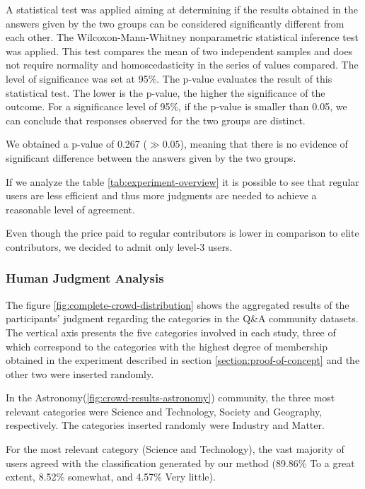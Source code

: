 A statistical test was applied aiming at determining if the results obtained in the answers given by the two groups can be considered significantly different from each other. The Wilcoxon-Mann-Whitney nonparametric statistical inference test was applied\cite{feltovich2003nonparametric}. This test compares the mean of two independent samples and does not require normality and homoscedasticity in the series of values compared. The level of significance was set at 95\%. The p-value evaluates the result of this statistical test. The lower is the p-value, the higher the significance of the outcome. For a significance level of 95\%, if the p-value is smaller than 0.05, we can conclude that responses observed for the two groups are distinct. 

We obtained a p-value of  0.267 ($\gg 0.05$), meaning that there is no evidence of significant difference between the answers given by the two groups. 

If we analyze the table \ref{tab:experiment-overview} it is possible to see that regular users are less efficient and thus more judgments are needed to achieve a reasonable level of agreement. 

Even though the price paid to regular contributors is lower in comparison to elite contributors, we decided to admit only level-3 users.

\subsubsection{\hspace*{3pt} Human Judgment Analysis}

The figure \ref{fig:complete-crowd-distribution} shows the aggregated results of the participants' judgment regarding the categories in the Q\&A community datasets. The vertical axis presents the five categories involved in each study, three of which correspond to the categories with the highest degree of membership obtained in the experiment described in section \ref{section:proof-of-concept} and the other two were inserted randomly.


 
In the Astronomy(\ref{fig:crowd-results-astronomy}) community, the three most relevant categories were Science and Technology, Society and Geography, respectively. The categories inserted randomly were Industry and Matter.

For the most relevant category (Science and Technology), the vast majority of users agreed with the classification generated by our method (89.86\% To a great extent, 8.52\% somewhat, and 4.57\% Very little).

